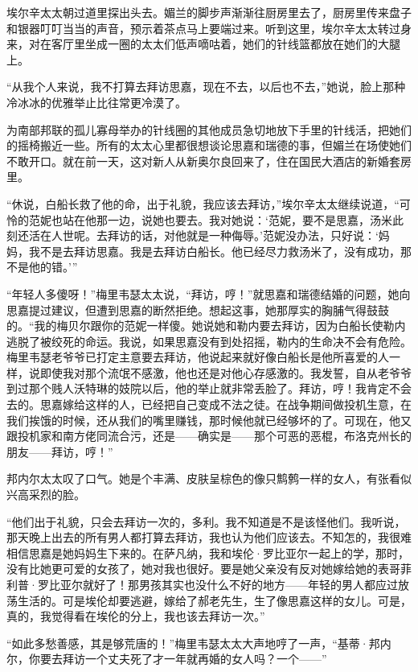 \par 埃尔辛太太朝过道里探出头去。媚兰的脚步声渐渐往厨房里去了，厨房里传来盘子和银器叮叮当当的声音，预示着茶点马上要端过来。听到这里，埃尔辛太太转过身来，对在客厅里坐成一圈的太太们低声嘀咕着，她们的针线篮都放在她们的大腿上。
\par “从我个人来说，我不打算去拜访思嘉，现在不去，以后也不去，”她说，脸上那种冷冰冰的优雅举止比往常更冷漠了。
\par 为南部邦联的孤儿寡母举办的针线圈的其他成员急切地放下手里的针线活，把她们的摇椅搬近一些。所有的太太心里都很想谈论思嘉和瑞德的事，但媚兰在场使她们不敢开口。就在前一天，这对新人从新奥尔良回来了，住在国民大酒店的新婚套房里。
\par “休说，白船长救了他的命，出于礼貌，我应该去拜访，”埃尔辛太太继续说道，“可怜的范妮也站在他那一边，说她也要去。我对她说：‘范妮，要不是思嘉，汤米此刻还活在人世呢。去拜访的话，对他就是一种侮辱。’范妮没办法，只好说：‘妈妈，我不是去拜访思嘉。我是去拜访白船长。他已经尽力救汤米了，没有成功，那不是他的错。'”
\par “年轻人多傻呀！”梅里韦瑟太太说，“拜访，哼！”就思嘉和瑞德结婚的问题，她向思嘉提过建议，但遭到思嘉的断然拒绝。想起这事，她那厚实的胸脯气得鼓鼓的。“我的梅贝尔跟你的范妮一样傻。她说她和勒内要去拜访，因为白船长使勒内逃脱了被绞死的命运。我说，如果思嘉没有到处招摇，勒内的生命决不会有危险。梅里韦瑟老爷爷已打定主意要去拜访，他说起来就好像白船长是他所喜爱的人一样，说即使我对那个流氓不感激，他也还是对他心存感激的。我发誓，自从老爷爷到过那个贱人沃特琳的妓院以后，他的举止就非常丢脸了。拜访，哼！我肯定不会去的。思嘉嫁给这样的人，已经把自己变成不法之徒。在战争期间做投机生意，在我们挨饿的时候，还从我们的嘴里赚钱，那时候他就已经够坏的了。可现在，他又跟投机家和南方佬同流合污，还是——确实是——那个可恶的恶棍，布洛克州长的朋友——拜访，哼！”
\par 邦内尔太太叹了口气。她是个丰满、皮肤呈棕色的像只鹪鹩一样的女人，有张看似兴高采烈的脸。
\par “他们出于礼貌，只会去拜访一次的，多利。我不知道是不是该怪他们。我听说，那天晚上出去的所有男人都打算去拜访，我也认为他们应该去。不知怎的，我很难相信思嘉是她妈妈生下来的。在萨凡纳，我和埃伦·罗比亚尔一起上的学，那时，没有比她更可爱的女孩了，她对我也很好。要是她父亲没有反对她嫁给她的表哥菲利普·罗比亚尔就好了！那男孩其实也没什么不好的地方——年轻的男人都应过放荡生活的。可是埃伦却要逃避，嫁给了郝老先生，生了像思嘉这样的女儿。可是，真的，我觉得看在埃伦的分上，我也该去拜访一次。”
\par “如此多愁善感，其是够荒唐的！”梅里韦瑟太太大声地哼了一声，“基蒂·邦内尔，你要去拜访一个丈夫死了才一年就再婚的女人吗？一个——”
